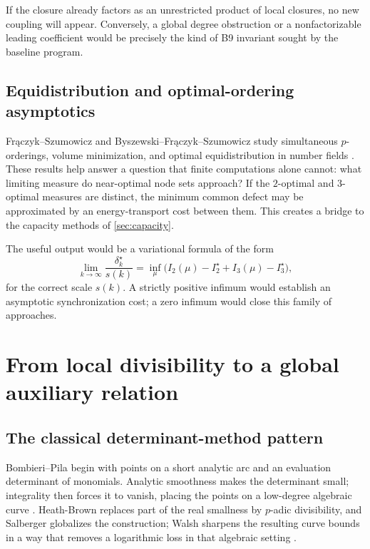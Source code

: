 \documentclass[10pt,letterpaper]{article}
\begin{document}
If the closure already factors as an unrestricted product of local closures, no new coupling
will appear.  Conversely, a global degree obstruction or a nonfactorizable leading
coefficient would be precisely the kind of B9 invariant sought by the baseline program.

\subsection{Equidistribution and optimal-ordering asymptotics}

Fr\k{a}czyk--Szumowicz and Byszewski--Fr\k{a}czyk--Szumowicz study simultaneous
\(p\)-orderings, volume minimization, and optimal equidistribution in number fields
\cite{FraczykSzumowicz,ByszewskiFraczykSzumowicz}.  These results help answer a question that
finite computations alone cannot: what limiting measure do near-optimal node sets approach?
If the \(2\)-optimal and \(3\)-optimal measures are distinct, the minimum common defect may
be approximated by an energy-transport cost between them.  This creates a bridge to the
capacity methods of \cref{sec:capacity}.

The useful output would be a variational formula of the form
\[
  \lim_{k\to\infty}\frac{\delta_k^\star}{s(k)}
  =\inf_{\mu}\bigl(I_2(\mu)-I_2^\star+I_3(\mu)-I_3^\star\bigr),
\]
for the correct scale \(s(k)\).  A strictly positive infimum would establish an asymptotic
synchronization cost; a zero infimum would close this family of approaches.

\clearpage
\section{From local divisibility to a global auxiliary relation}
\label{sec:determinant}

\subsection{The classical determinant-method pattern}

Bombieri--Pila begin with points on a short analytic arc and an evaluation determinant of
monomials.  Analytic smoothness makes the determinant small; integrality then forces it to
vanish, placing the points on a low-degree algebraic curve
\cite{BombieriPila,PilaPostulation}.  Heath-Brown replaces part of the real smallness by
\(p\)-adic divisibility, and Salberger globalizes the construction; Walsh sharpens the
resulting curve bounds in a way that removes a logarithmic loss in that algebraic setting
\cite{HeathBrown2002,Salberger2007,Walsh2015}.
\end{document}
